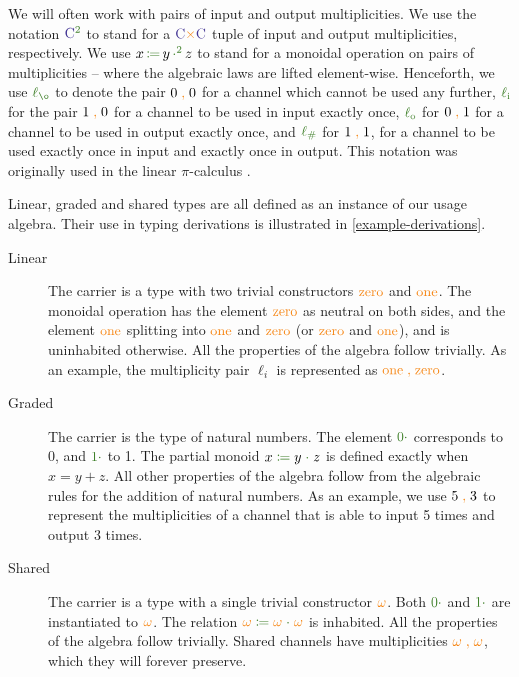 \documentclass[a4paper,UKenglish,cleveref,autoref,thm-restate,authorcolumns]{lipics-v2019}
\theoremstyle{definition}
\newcommand{\picalc}{$\pi$-calculus}
\newcommand{\type}[1]{\textcolor{BlueViolet}{\operatorname{#1}}}
\newcommand{\constr}[1]{\textcolor{BurntOrange}{\operatorname{#1}}}
\newcommand{\func}[1]{\textcolor{OliveGreen}{\operatorname{#1}}}
\newcommand{\comma}{\; \constr{,} \;}
\newcommand{\op}[3]{#1 \; \func{\coloneqq} \; #2 \; \func{\cdot} \; #3}
\newcommand{\opsquared}[3]{#1 \, \func{\coloneqq} \, #2 \, \func{\cdot^2} \, #3}
\newcommand{\zero}{\func{0\cdot}}
\newcommand{\one}{\func{1\cdot}}
\newcommand{\li}{\func{\ell_i}}
\newcommand{\lo}{\func{\ell_o}}
\newcommand{\lz}{\func{\ell_{\o}}}
\newcommand{\lio}{\func{\ell_{\#}}}
\begin{document}
\begin{note}
  \label{note:linearity}
  We will often work with pairs of input and output multiplicities.
  We use the notation $\type{C}^{\func{2}}$ to stand for a $\type{C} \constr{\times} \type{C}$ tuple of input and output multiplicities, respectively.
  We use $\opsquared{x}{y}{z}$ to stand for a monoidal operation on pairs of multiplicities -- where the algebraic laws are lifted element-wise.
%
  Henceforth, we use $\lz$ to denote the pair $0 \comma 0$ for a channel which cannot be used any further, $\li$ for the pair $1 \comma 0$ for a channel to be used in input exactly once, $\lo$ for $0 \comma 1$ for a channel to be used in output exactly once, and $\lio$ for $1 \comma 1$, for a channel to be used exactly once in input and exactly once in output.
  This notation was originally used in the linear \picalc{} \cite{KPT96,Sangio01}.
\end{note}

Linear, graded and shared types are all defined as an instance of our usage algebra.
Their use in typing derivations is illustrated in \autoref{example-derivations}.
\begin{description}
  \item [Linear]
    The carrier is a type with two trivial constructors $\constr{zero}$ and $\constr{one}$.
    The monoidal operation has the element $\constr{zero}$ as neutral on both sides, and the element $\constr{one}$ splitting into $\constr{one}$ and $\constr{zero}$ (or $\constr{zero}$ and $\constr{one}$), and is uninhabited otherwise.
    All the properties of the algebra follow trivially.
    As an example, the multiplicity pair $\ell_i$ is represented as $\constr{one} \comma \constr{zero}$.

    \item [Graded]
    The carrier is the type of natural numbers.
    The element $\zero$ corresponds to 0, and $\one$ to 1.
    The partial monoid $\op{x}{y}{z}$ is defined exactly when $x = y + z$.
    All other properties of the algebra follow from the algebraic rules for the addition of natural numbers.
    As an example, we use $5 \comma 3$ to represent the multiplicities of a channel that is able to input 5 times and output 3 times.

    \item [Shared]
    The carrier is a type with a single trivial constructor $\constr{\omega}$.
    Both $\zero$ and $\one$ are instantiated to $\constr{\omega}$.
    The relation $\op{\constr{\omega}}{\constr{\omega}}{\constr{\omega}}$ is inhabited.
    All the properties of the algebra follow trivially.
    Shared channels have multiplicities $\constr{\omega} \comma \constr{\omega}$, which they will forever preserve.
\end{description}
\end{document}
